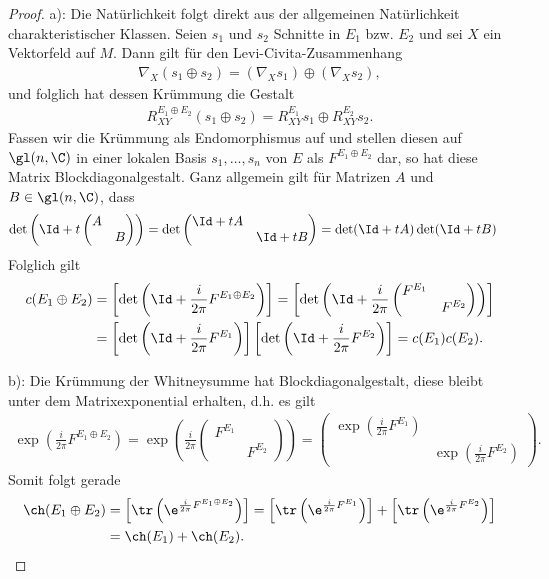 \documentclass[%
	paper=a5,%
	fleqn,%
	DIV=18,%
	BCOR=0mm,
	fontsize=11pt,
	titlepage=false,%
	bibliography=totoc,
	DIV=18,%
	twoside=true,
	pdftitle=Riemannsche Geometrie,
	pdfauthor=Uwe Semmelmann,
	numbers=noendperiod]%
	{scrbook}
\begin{document}
\begin{proof}
a): Die Natürlichkeit folgt direkt aus der allgemeinen Natürlichkeit
charakteristischer Klassen.
Seien $s_1$ und $s_2$ Schnitte in $E_1$ bzw. $E_2$ und sei $X$ ein Vektorfeld auf $M$. Dann gilt für den Levi-Civita-Zusammenhang
\begin{align*}
\nabla_{X}(s_{1}\oplus s_{2}) = (\nabla_{X}s_{1})\oplus (\nabla_{X}s_{2}),
\end{align*}
und folglich hat dessen Krümmung die Gestalt
\begin{align*}
R_{XY}^{E_{1}\oplus E_{2}}(s_{1}\oplus s_{2}) = R_{XY}^{E_{1}}s_{1}\oplus R_{XY}^{E_{2}}s_{2}.
\end{align*}
Fassen wir die Krümmung als Endomorphismus auf und stellen diesen auf $\gl(n,\C)$ in einer lokalen Basis $s_1,\ldots,s_n$ von $E$ als $F^{E_{1}\oplus E_{2}}$ dar, so hat diese Matrix Blockdiagonalgestalt. Ganz allgemein gilt für Matrizen $A$ und $B\in\gl(n,\C)$, dass
\begin{align*}
\det\left(
\Id +
t\begin{pmatrix}
A \\ & B
\end{pmatrix}
\right) 
&=
\det
\begin{pmatrix}
\Id + tA \\ & \Id + tB
\end{pmatrix}
= 
\det(\Id + tA)\det(\Id+tB)
\end{align*}
Folglich gilt
\begin{align*}
c(E_{1}\oplus E_{2}) &= 
\left[\det\left(\Id + \frac{i}{2\pi}F^{E_{1}\oplus E_{2}}\right)\right]
=
\left[\det\left(\Id + \frac{i}{2\pi}
\begin{pmatrix}
F^{E_{1}}\\
& F^{E_{2}}
\end{pmatrix}
\right)\right]\\
&=
\left[\det\left(\Id + \frac{i}{2\pi}
F^{E_{1}}
\right)\right]
\left[\det\left(\Id + \frac{i}{2\pi}
F^{E_{2}}
\right)\right]
= 
c(E_{1})c(E_{2}).
\end{align*}

b): Die Krümmung der Whitneysumme hat Blockdiagonalgestalt, diese bleibt unter dem Matrixexponential erhalten, d.h. es gilt
\begin{align*}
\exp\left(\frac{i}{2\pi} F^{E_{1}\oplus E_{2}}\right)
=
\exp\left(\frac{i}{2\pi} 
\begin{pmatrix}
F^{E_{1}}\\
&F^{E_{2}}
\end{pmatrix}
\right)
= 
\begin{pmatrix}
\exp\left(\frac{i}{2\pi} F^{E_{1}}\right)\\
&
\exp\left(\frac{i}{2\pi} F^{E_{2}}\right)
\end{pmatrix}.
\end{align*}
Somit folgt gerade
\begin{align*}
\ch(E_{1}\oplus E_{2}) &= 
\left[\tr\left(\e^{\frac{i}{2\pi} F^{E_{1}\oplus E_{2}}}\right)\right]
=
\left[\tr\left(\e^{\frac{i}{2\pi} F^{E_{1}}}\right)\right]
+
\left[\tr\left(\e^{\frac{i}{2\pi} F^{E_{2}}}\right)\right]\\
&=
\ch(E_{1})+\ch(E_{2}).
\end{align*}


\end{proof}
\end{document}

